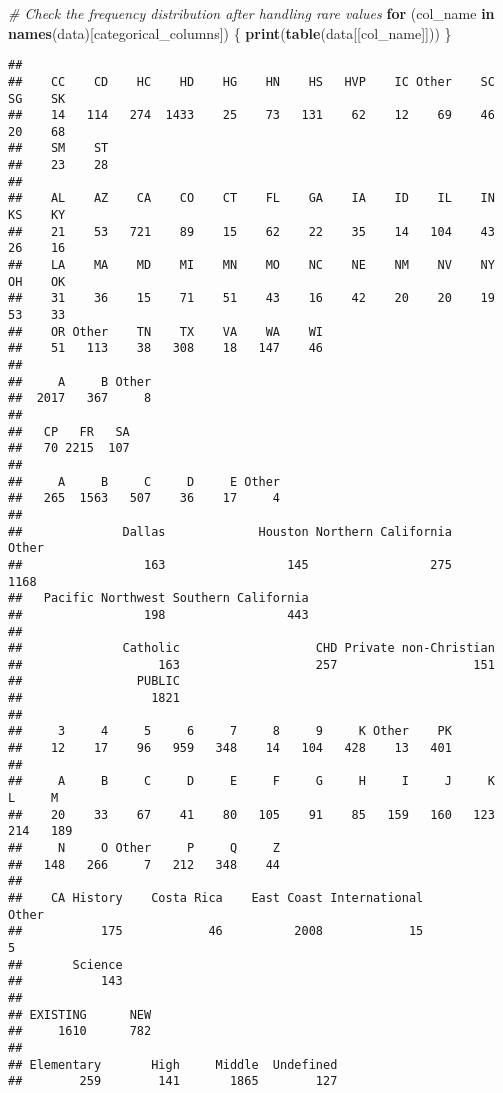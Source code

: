 \documentclass[
]{article}
\newenvironment{Shaded}{\begin{snugshade}}{\end{snugshade}}
\newcommand{\CommentTok}[1]{\textcolor[rgb]{0.56,0.35,0.01}{\textit{#1}}}
\newcommand{\ControlFlowTok}[1]{\textcolor[rgb]{0.13,0.29,0.53}{\textbf{#1}}}
\newcommand{\FunctionTok}[1]{\textcolor[rgb]{0.13,0.29,0.53}{\textbf{#1}}}
\newcommand{\NormalTok}[1]{#1}
\begin{document}
\begin{Shaded}
\begin{Highlighting}[]
\CommentTok{\# Check the frequency distribution after handling rare values}
\ControlFlowTok{for}\NormalTok{ (col\_name }\ControlFlowTok{in} \FunctionTok{names}\NormalTok{(data)[categorical\_columns]) \{}
  \FunctionTok{print}\NormalTok{(}\FunctionTok{table}\NormalTok{(data[[col\_name]]))}
\NormalTok{\}}
\end{Highlighting}
\end{Shaded}

\begin{verbatim}
## 
##    CC    CD    HC    HD    HG    HN    HS   HVP    IC Other    SC    SG    SK 
##    14   114   274  1433    25    73   131    62    12    69    46    20    68 
##    SM    ST 
##    23    28 
## 
##    AL    AZ    CA    CO    CT    FL    GA    IA    ID    IL    IN    KS    KY 
##    21    53   721    89    15    62    22    35    14   104    43    26    16 
##    LA    MA    MD    MI    MN    MO    NC    NE    NM    NV    NY    OH    OK 
##    31    36    15    71    51    43    16    42    20    20    19    53    33 
##    OR Other    TN    TX    VA    WA    WI 
##    51   113    38   308    18   147    46 
## 
##     A     B Other 
##  2017   367     8 
## 
##   CP   FR   SA 
##   70 2215  107 
## 
##     A     B     C     D     E Other 
##   265  1563   507    36    17     4 
## 
##              Dallas             Houston Northern California               Other 
##                 163                 145                 275                1168 
##   Pacific Northwest Southern California 
##                 198                 443 
## 
##              Catholic                   CHD Private non-Christian 
##                   163                   257                   151 
##                PUBLIC 
##                  1821 
## 
##     3     4     5     6     7     8     9     K Other    PK 
##    12    17    96   959   348    14   104   428    13   401 
## 
##     A     B     C     D     E     F     G     H     I     J     K     L     M 
##    20    33    67    41    80   105    91    85   159   160   123   214   189 
##     N     O Other     P     Q     Z 
##   148   266     7   212   348    44 
## 
##    CA History    Costa Rica    East Coast International         Other 
##           175            46          2008            15             5 
##       Science 
##           143 
## 
## EXISTING      NEW 
##     1610      782 
## 
## Elementary       High     Middle  Undefined 
##        259        141       1865        127 

\end{verbatim}
\end{document}
